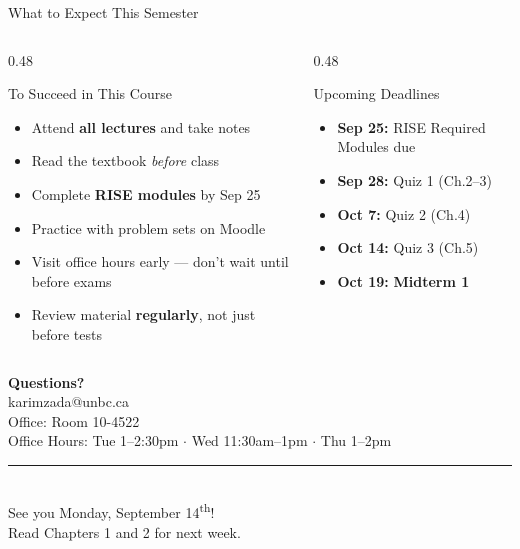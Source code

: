 \documentclass[aspectratio=169]{beamer}
\begin{document}
\begin{frame}{What to Expect This Semester}
\transfade
\begin{columns}
  \begin{column}{0.48\textwidth}
    \begin{block}{To Succeed in This Course}
      \begin{itemize}
        \item Attend \textbf{all lectures} and take notes
        \item Read the textbook \textit{before} class
        \item Complete \textbf{RISE modules} by Sep 25
        \item Practice with problem sets on Moodle
        \item Visit office hours early --- don't wait until before exams
        \item Review material \textbf{regularly}, not just before tests
      \end{itemize}
    \end{block}
  \end{column}
  \begin{column}{0.48\textwidth}
    \begin{block}{Upcoming Deadlines}
      \begin{itemize}
        \item \textbf{Sep 25:} RISE Required Modules due
        \item \textbf{Sep 28:} Quiz 1 (Ch.2--3)
        \item \textbf{Oct 7:} Quiz 2 (Ch.4)
        \item \textbf{Oct 14:} Quiz 3 (Ch.5)
        \item \textbf{Oct 19:} \textbf{Midterm 1}
      \end{itemize}
    \end{block}

  \end{column}
\end{columns}
\end{frame}

\begin{frame}[plain]
\transfade
  \begin{center}
    \vspace{2em}
    {\Large \textbf{Questions?}}\\[1em]
    {\normalsize karimzada@unbc.ca}\\[0.5em]
    {\normalsize Office: Room 10-4522}\\[0.5em]
    {\normalsize Office Hours: Tue 1--2:30pm $\cdot$ Wed 11:30am--1pm $\cdot$ Thu 1--2pm}\\[1.5em]
    \textcolor{accent}{\rule{0.6\textwidth}{0.4pt}}\\[1em]
    {\small See you Monday, September 14\textsuperscript{th}!}\\
    {\small Read Chapters 1 and 2 for next week.}
  \end{center}
\end{frame}

\end{document}
